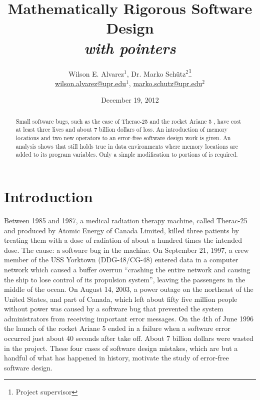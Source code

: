 \documentclass[11pt]{article}
\title{Mathematically Rigorous Software Design \\ \emph{with pointers}}
\author{Wilson E. Alvarez$^{1}$, Dr. Marko Sch\"utz$^{2}$\footnote{Project supervisor} \\ \url{wilson.alvarez@upr.edu}$^{1}$, \url{marko.schutz@upr.edu}$^{2}$} \date{December 19, 2012}
\newcounter{definition}
\newcounter{lemma}
\newcounter{theorem}
\newcounter{example}
\newcounter{case}
\begin{document}
\maketitle


\begin{abstract}
Small software bugs, such as the case of Therac-25\cite{therac} and the rocket Ariane 5 \cite{rocket}\cite{rocket2}, have cost at least three lives and about 7 billion dollars of loss. An introduction of memory locations and two new operators to an error-free software design work \cite{baber} is given. An analysis shows that \cite{baber} still holds true in data environments where memory locations are added to its program variables. Only a simple modification to portions of \cite{baber} is required.
\end{abstract}


\section{Introduction} %
\setcounter{definition}{0}
\setcounter{lemma}{0}
\setcounter{theorem}{0}
\setcounter{example}{0}

Between 1985 and 1987, a medical radiation therapy machine, called Therac-25 and produced by Atomic Energy of Canada Limited, killed three patients by treating them with a dose of radiation of about a hundred times the intended dose. The cause: a software bug in the machine\cite{therac}. On September 21, 1997, a crew member of the USS Yorktown (DDG-48/CG-48) entered data in a computer network which caused a buffer overrun ``crashing the entire network and causing the ship to lose control of its propulsion system'', leaving the passengers in the middle of the ocean\cite{windows}. On August 14, 2003, a power outage on the northeast of the United States, and part of Canada, which left about fifty five million people without power was caused by a software bug that prevented the system administrators from receiving important error messages\cite{unixbug}. On the 4th of June 1996 the launch of the rocket Ariane 5 ended in a failure when a software error occurred just about 40 seconds after take off. About 7
billion dollars were wasted in the project\cite{rocket}\cite{rocket2}. These four cases of software design mistakes, which are but a handful of what has happened in history, motivate the study of error-free software design.
\end{document}

